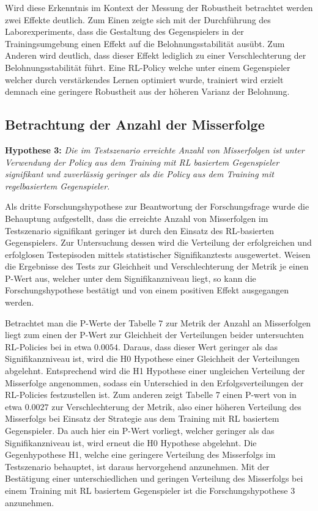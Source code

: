 Wird diese Erkenntnis im Kontext der Messung der Robustheit betrachtet werden zwei Effekte deutlich.
Zum Einen zeigte sich mit der Durchführung des Laborexperiments, dass die Gestaltung des Gegenspielers in der Trainingsumgebung einen Effekt auf die Belohnungsstabilität ausübt.
Zum Anderen wird deutlich, dass dieser Effekt lediglich zu einer Verschlechterung der Belohnungsstabilität führt.
Eine RL-Policy welche unter einem Gegenspieler welcher durch verstärkendes Lernen optimiert wurde, trainiert wird erzielt demnach eine geringere Robustheit aus der höheren Varianz der Belohnung.

\subsection{Betrachtung der Anzahl der Misserfolge}

\textbf{Hypothese 3:}
\textit{Die im Testszenario erreichte Anzahl von Misserfolgen ist unter Verwendung der Policy aus dem Training mit RL basiertem Gegenspieler signifikant und zuverlässig geringer als die Policy aus dem Training mit regelbasiertem Gegenspieler.}

Als dritte Forschungshypothese zur Beantwortung der Forschungsfrage wurde die Behauptung aufgestellt, dass die erreichte Anzahl von Misserfolgen im Testszenario signifikant geringer ist durch den Einsatz des RL-basierten Gegenspielers.
Zur Untersuchung dessen wird die Verteilung der erfolgreichen und erfolglosen Testepisoden mittels statistischer Signifikanztests ausgewertet. 
Weisen die Ergebnisse des Tests zur Gleichheit und Verschlechterung der Metrik je einen P-Wert aus, welcher unter dem Signifikanzniveau liegt, so kann die Forschungshypothese bestätigt und von einem positiven Effekt ausgegangen werden.

Betrachtet man die P-Werte der Tabelle 7 zur Metrik der Anzahl an Misserfolgen liegt zum einen der P-Wert zur Gleichheit der Verteilungen beider untersuchten RL-Policies bei in etwa $0.0054$.
Daraus, dass dieser Wert geringer als das Signifikanzniveau ist, wird die H0 Hypothese einer Gleichheit der Verteilungen abgelehnt.
Entsprechend wird die H1 Hypothese einer ungleichen Verteilung der Misserfolge angenommen, sodass ein Unterschied in den Erfolgsverteilungen der RL-Policies festzustellen ist.
Zum anderen zeigt Tabelle 7 einen P-wert von in etwa $0.0027$ zur Verschlechterung der Metrik, also einer höheren Verteilung des Misserfolgs bei Einsatz der Strategie aus dem Training mit RL basiertem Gegenspieler.
Da auch hier ein P-Wert vorliegt, welcher geringer als das Signifikanzniveau ist, wird erneut die H0 Hypothese abgelehnt.
Die Gegenhypothese H1, welche eine geringere Verteilung des Misserfolgs im Testszenario behauptet, ist daraus hervorgehend anzunehmen.
Mit der Bestätigung einer unterschiedlichen und geringen Verteilung des Misserfolgs bei einem Training mit RL basiertem Gegenspieler ist die Forschungshypothese 3 anzunehmen.


